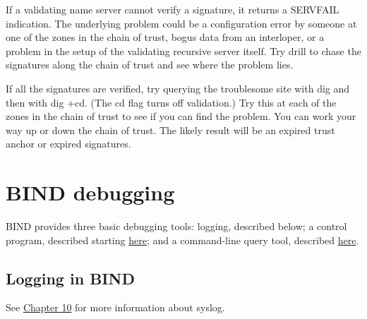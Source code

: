 
If a validating name server cannot verify a signature, it returns a
\protect\hypertarget{part0024_split_068.htmlux5cux23_idIndexMarker2279}{}{}SERVFAIL
indication. The underlying problem could be a configuration error by
someone at one of the zones in the chain of trust, bogus data from an
interloper, or a problem in the setup of the validating recursive server
itself. Try {drill} to chase the signatures along the chain of trust and
see where the problem lies.

If all the signatures are verified, try querying the troublesome site
with {dig} and then with {dig +cd}. (The {cd} flag turns off
validation.) Try this at each of the zones in the chain of trust to see
if you can find the problem. You can work your way up or down the chain
of trust. The likely result will be an expired trust anchor or expired
signatures.


\section{BIND debugging}


\protect\hypertarget{part0024_split_069.htmlux5cux23_idIndexMarker2280}{}{}\protect\hypertarget{part0024_split_069.htmlux5cux23_idIndexMarker2281}{}{}\protect\hypertarget{part0024_split_069.htmlux5cux23_idIndexMarker2282}{}{}BIND
provides three basic debugging tools: logging, described below; a
control program, described starting
\protect\hyperlink{part0024_split_071.htmlux5cux23_idTextAnchor964}{here};
and a command-line query tool, described
\protect\hyperlink{part0024_split_072.htmlux5cux23_idTextAnchor966}{here}.

\protect\hypertarget{part0024_split_070.html}{}{}

\hypertarget{part0024_split_070.htmlux5cux23_idContainer1069}{}
\hypertarget{part0024_split_070.htmlux5cux23calibre_pb_69}{%
\subsection[Logging in
BIND]{\texorpdfstring{\protect\hypertarget{part0024_split_070.htmlux5cux23_idTextAnchor955}{}{}Logging
in
BIND}{Logging in BIND}}\label{part0024_split_070.htmlux5cux23calibre_pb_69}}

\leavevmode\hypertarget{part0024_split_070.htmlux5cux23_idContainer1053}{}%
See
\protect\hyperlink{part0017_split_000.htmlux5cux23_idTextAnchor493}{Chapter
10} for more information about syslog.

